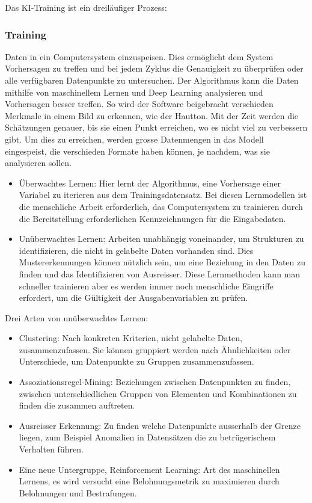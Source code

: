 \documentclass{report}
\begin{document}
 
Das KI-Training ist ein dreiläufiger Prozess:


\subsubsection{Training} Daten in ein Computersystem einzuspeisen. Dies ermöglicht dem System Vorhersagen zu treffen und bei jedem Zyklus die Genauigkeit zu überprüfen oder alle verfügbaren Datenpunkte zu untersuchen. Der Algorithmus kann die Daten mithilfe von maschinellem Lernen und Deep Learning analysieren und Vorhersagen besser treffen. So wird der Software beigebracht verschieden Merkmale in einem Bild zu erkennen, wie der Hautton. Mit der Zeit werden die Schätzungen genauer, bis sie einen Punkt erreichen, wo es nicht viel zu verbessern gibt.
Um dies zu erreichen, werden grosse Datenmengen in das Modell eingespeist, die verschieden Formate haben können, je nachdem, was sie analysieren sollen.

\begin{itemize}
    \item Überwachtes Lernen: Hier lernt der Algorithmus, eine Vorhersage einer Variabel zu iterieren aus dem Trainingsdatensatz. Bei diesen Lernmodellen ist die menschliche Arbeit erforderlich, das Computersystem zu trainieren durch die Bereitstellung erforderlichen Kennzeichnungen für die Eingabedaten.
    \item Unüberwachtes Lernen: Arbeiten unabhängig voneinander, um Strukturen zu identifizieren, die nicht in gelabelte Daten vorhanden sind. Dies Mustererkennungen können nützlich sein, um eine Beziehung in den Daten zu finden und das Identifizieren von Ausreisser. Diese Lernmethoden kann man schneller trainieren aber es werden immer noch menschliche Eingriffe erfordert, um die Gültigkeit der Ausgabenvariablen zu prüfen.
\end{itemize}

Drei Arten von unüberwachtes Lernen:
\begin{itemize}
    \item Clustering: Nach konkreten Kriterien, nicht gelabelte Daten, zusammenzufassen. Sie können gruppiert werden nach Ähnlichkeiten oder Unterschiede, um Datenpunkte zu Gruppen zusammenzufassen.  
    \item Assoziationsregel-Mining: Beziehungen zwischen Datenpunkten zu finden, zwischen unterschiedlichen Gruppen von Elementen und Kombinationen zu finden die zusammen auftreten.
    \item Ausreisser Erkennung: Zu finden welche Datenpunkte ausserhalb der Grenze liegen, zum Beispiel Anomalien in Datensätzen die zu betrügerischem Verhalten führen.
    \item Eine neue Untergruppe, Reinforcement Learning: Art des maschinellen Lernens, es wird versucht eine Belohnungsmetrik zu maximieren durch Belohnungen und Bestrafungen.
\end{itemize}
\end{document}
